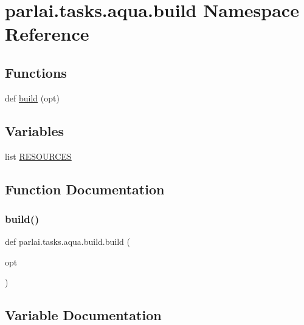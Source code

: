 \hypertarget{namespaceparlai_1_1tasks_1_1aqua_1_1build}{}\section{parlai.\+tasks.\+aqua.\+build Namespace Reference}
\label{namespaceparlai_1_1tasks_1_1aqua_1_1build}
\subsection*{Functions}
\begin{DoxyCompactItemize}
\item 
def \hyperlink{namespaceparlai_1_1tasks_1_1aqua_1_1build_a6b4f6ce85b0fc6e988403a0def089b5a}{build} (opt)
\end{DoxyCompactItemize}
\subsection*{Variables}
\begin{DoxyCompactItemize}
\item 
list \hyperlink{namespaceparlai_1_1tasks_1_1aqua_1_1build_a5471ace3ef77263affdc920e7c92b948}{R\+E\+S\+O\+U\+R\+C\+ES}
\end{DoxyCompactItemize}


\subsection{Function Documentation}
\mbox{\label{namespaceparlai_1_1tasks_1_1aqua_1_1build_a6b4f6ce85b0fc6e988403a0def089b5a}} 
\subsubsection{\texorpdfstring{build()}{build()}}
{\footnotesize\ttfamily def parlai.\+tasks.\+aqua.\+build.\+build (\begin{DoxyParamCaption}\item[{}]{opt }\end{DoxyParamCaption})}



\subsection{Variable Documentation}
\mbox{\label{namespaceparlai_1_1tasks_1_1aqua_1_1build_a5471ace3ef77263affdc920e7c92b948}} 
